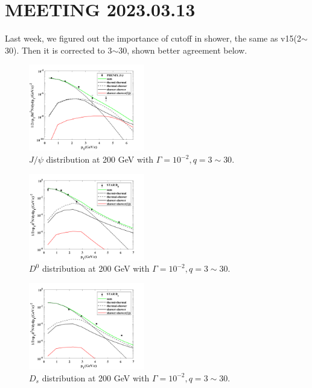 \documentclass[twocolumn,aps,superscriptaddress,nofootinbib,floatfix]{revtex4}
\begin{document}
\section{MEETING 2023.03.13}
Last week, we figured out the importance of cutoff in shower, the same as v15(2$\sim$30). Then it is corrected to 3$\sim$30, shown better agreement below.
\begin{figure}[H]
	\includegraphics[width=0.45\textwidth]{Jpsi200_230313.png}
	\caption{$J/\psi$ distribution at 200 GeV with $\Gamma=10^{-2}, q=3\sim30$. }
	\label{fig72}
\end{figure}
\begin{figure}[H]
	\includegraphics[width=0.45\textwidth]{D0200_230313.png}
	\caption{$D^0$ distribution at 200 GeV with $\Gamma=10^{-2}, q=3\sim30$. }
	\label{fig73}
\end{figure}
\begin{figure}[H]
	\includegraphics[width=0.45\textwidth]{Ds200_230313.png}
	\caption{$D_s$ distribution at 200 GeV with $\Gamma=10^{-2}, q=3\sim30$. }
	\label{fig74}
\end{figure}
\end{document}
